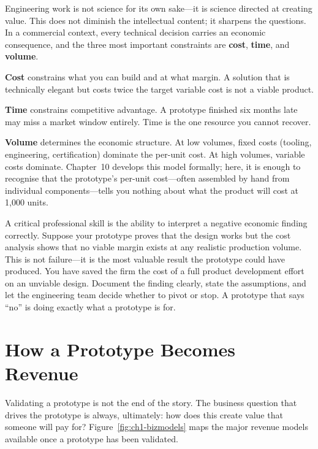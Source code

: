 Engineering work is not science for its own sake---it is science directed
at creating value.
This does not diminish the intellectual content; it sharpens the
questions.
In a commercial context, every technical decision carries an economic
consequence, and the three most important constraints are \textbf{cost},
\textbf{time}, and \textbf{volume}.

\textbf{Cost} constrains what you can build and at what margin.
A solution that is technically elegant but costs twice the target
variable cost is not a viable product.

\textbf{Time} constrains competitive advantage.
A prototype finished six months late may miss a market window entirely.
Time is the one resource you cannot recover.

\textbf{Volume} determines the economic structure.
At low volumes, fixed costs (tooling, engineering, certification) dominate
the per-unit cost.
At high volumes, variable costs dominate.
Chapter~10 develops this model formally; here, it is enough to recognise
that the prototype's per-unit cost---often assembled by hand from
individual components---tells you nothing about what the product will cost
at 1,000 units.

A critical professional skill is the ability to interpret a negative
economic finding correctly.
Suppose your prototype proves that the design works but the cost analysis
shows that no viable margin exists at any realistic production volume.
This is not failure---it is the most valuable result the prototype could
have produced.
You have saved the firm the cost of a full product development effort on
an unviable design.
Document the finding clearly, state the assumptions, and let the
engineering team decide whether to pivot or stop.
A prototype that says ``no'' is doing exactly what a prototype is for.

\section{How a Prototype Becomes Revenue}
\label{sec:ch1-revenue-models}

Validating a prototype is not the end of the story.
The business question that drives the prototype is always, ultimately:
how does this create value that someone will pay for?
Figure~\ref{fig:ch1-bizmodels} maps the major revenue models available
once a prototype has been validated.

